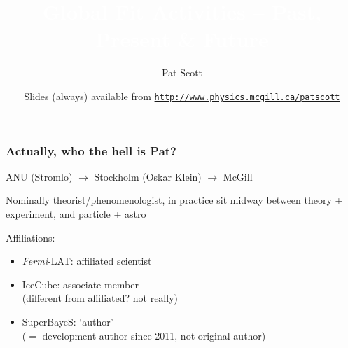 \documentclass[xcolor=dvipsnames]{beamer}
\title[{\textcolor{white}Global Fit Activities}]{\textcolor{white}{Global Fit Activities -- Past, Present \& Future}}
\author[\textcolor{medgrey}{Pat Scott -- Oct 8 -- Global Fit Activities}]{Pat Scott}
\institute{\small{Department of Physics, McGill University}}
\date[Oct 8 2012]{Slides (always) available from \color[rgb]{0.1, 0.2, 0.6} \href{http://www.physics.mcgill.ca/~patscott}{\tt http://www.physics.mcgill.ca/{\urltilda}patscott}}
\begin{document}
\begin{frame}
  \titlepage
\end{frame}

\begin{frame}
\frametitle{Actually, who the hell is Pat?}

ANU (Stromlo) $\rightarrow$ Stockholm (Oskar Klein) $\rightarrow$ McGill\vspace{5mm}

Nominally theorist/phenomenologist, in practice sit midway between theory + experiment, and particle + astro\vspace{5mm}

Affiliations:
\begin{itemize}
\item \emph{Fermi}-LAT: affiliated scientist
\item IceCube: associate member\\(different from affiliated? not really)
\item SuperBayeS: `author'\\($=$ development author since 2011, not original author)
\end{itemize}

\end{frame}
\end{document}
